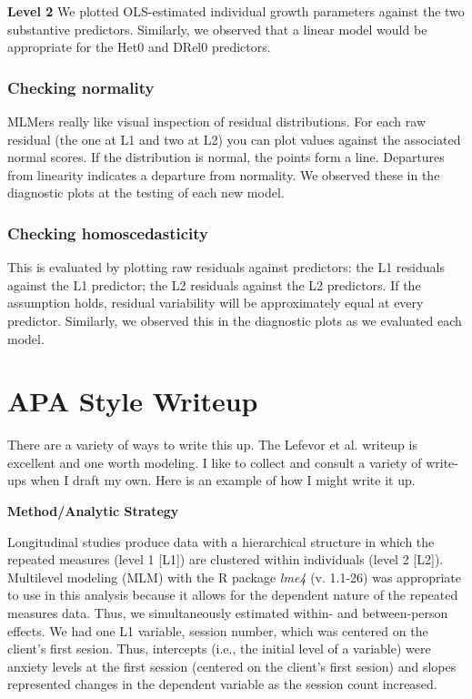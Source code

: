 \documentclass[
  11pt,
]{book}
\begin{document}
\textbf{Level 2} We plotted OLS-estimated individual growth parameters against the two substantive predictors. Similarly, we observed that a linear model would be appropriate for the Het0 and DRel0 predictors.

\hypertarget{checking-normality}{%
\subsubsection{Checking normality}\label{checking-normality}}

MLMers really like visual inspection of residual distributions. For each raw residual (the one at L1 and two at L2) you can plot values against the associated normal scores. If the distribution is normal, the points form a line. Departures from linearity indicates a departure from normality. We observed these in the diagnostic plots at the testing of each new model.

\hypertarget{checking-homoscedasticity}{%
\subsubsection{Checking homoscedasticity}\label{checking-homoscedasticity}}

This is evaluated by plotting raw residuals against predictors: the L1 residuals against the L1 predictor; the L2 residuals against the L2 predictors. If the assumption holds, residual variability will be approximately equal at every predictor. Similarly, we observed this in the diagnostic plots as we evaluated each model.

\hypertarget{apa-style-writeup-2}{%
\section{APA Style Writeup}\label{apa-style-writeup-2}}

There are a variety of ways to write this up. The Lefevor et al. \citeyearpar{lefevor_religious_2017} writeup is excellent and one worth modeling. I like to collect and consult a variety of write-ups when I draft my own. Here is an example of how I might write it up.

\textbf{Method/Analytic Strategy}

Longitudinal studies produce data with a hierarchical structure in which the repeated measures (level 1 {[}L1{]}) are clustered within individuals (level 2 {[}L2{]}). Multilevel modeling (MLM) with the R package \emph{lme4} (v. 1.1-26) was appropriate to use in this analysis because it allows for the dependent nature of the repeated measures data. Thus, we simultaneously estimated within- and between-person effects. We had one L1 variable, session number, which was centered on the client's first sesion. Thus, intercepts (i.e., the initial level of a variable) were anxiety levels at the first session (centered on the client's first sesion) and slopes represented changes in the dependent variable as the session count increased.
\end{document}
